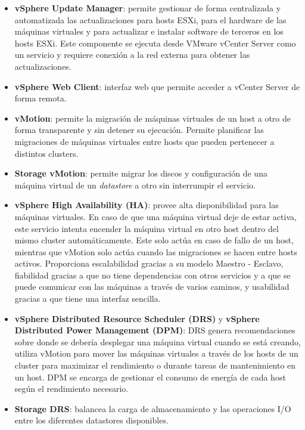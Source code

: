 \begin{itemize}
    \item \textbf{vSphere Update Manager}: permite gestionar de forma centralizada y automatizada las actualizaciones para hosts ESXi, para el hardware de las máquinas virtuales y para actualizar e instalar software de terceros en los hosts ESXi. Este componente se ejecuta desde VMware vCenter Server como un servicio y requiere conexión a la red externa para obtener las actualizaciones.
   
    \item \textbf{vSphere Web Client}: interfaz web que permite acceder a vCenter Server de forma remota.
    
    \item \textbf{vMotion}: permite la migración de máquinas virtuales de un host a otro de forma transparente y sin detener su ejecución. Permite planificar las migraciones de máquinas virtuales entre hosts que pueden pertenecer a distintos clusters.
    
    \item \textbf{Storage vMotion}: permite migrar los discos y configuración de una máquina virtual de un \textit{datastore} a otro sin interrumpir el servicio.
    
    \item \textbf{vSphere High Availability (HA)}: provee alta disponibilidad para las máquinas virtuales. En caso de que una máquina virtual deje de estar activa, este servicio intenta encender la máquina  virtual en otro host dentro del mismo cluster automáticamente. Este solo actúa en caso de fallo de un host, mientras que vMotion solo actúa cuando las migraciones se hacen entre hosts activos. Proporciona escalabilidad gracias a su modelo Maestro - Esclavo, fiabilidad gracias a que no tiene dependencias con otros servicios y a que se puede comunicar con las máquinas a través de varios caminos, y usabilidad gracias a que tiene una interfaz sencilla.
    
    \item \textbf{vSphere Distributed Resource Scheduler (DRS)} y \textbf{vSphere Distributed Power Management (DPM)}: DRS genera recomendaciones sobre donde se debería desplegar una máquina virtual cuando se está creando, utiliza vMotion para mover las máquinas virtuales a través de los hosts de un cluster para maximizar el rendimiento o durante tareas de mantenimiento en un host. DPM se encarga de gestionar el consumo de energía de cada host según el rendimiento necesario.
    \item \textbf{Storage DRS}: balancea la carga de almacenamiento y las operaciones I/O entre los diferentes datastores disponibles.
    

\end{itemize}

